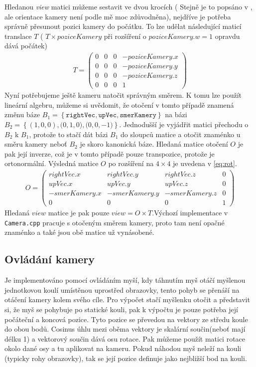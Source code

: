 Hledanou \textit{view} matici můžeme sestavit ve dvou krocích ( Stejně je to popsáno v \cite{lookAt}, ale orientace kamery není podle mě moc zdůvodněna), nejdříve je potřeba správně přesunout pozici kamery do počátku. To lze udělat následující maticí translace $ T $ ( $ T\times poziceKamery $ při rozšíření o $ poziceKamery.w=1 $ opravdu dává počátek)
\begin{align}
T=
\begin{pmatrix}
0 & 0 & 0 & -poziceKamery.x\\
0 & 0 & 0 & -poziceKamery.y\\
0 & 0 & 0 & -poziceKamery.z\\
0 & 0 & 0 & 1
\end{pmatrix}
\end{align}
Nyní potřebujeme ještě kameru natočit správným směrem. K tomu lze použít lineární algebru, můžeme si uvědomit, že otočení v tomto případě znamená změnu báze $ B_1 = \left\lbrace \texttt{rightVec},\texttt{upVec},\texttt{smerKamery}\right\rbrace $ na bázi 
$ B_2 = \left\lbrace (1,0,0),\texttt(0,1,0),\texttt(0,0,-1)\right\rbrace $.
Jednodušší je vyjádřit matici přechodu o $ B_2 $ k $ B_1 $, protože to stačí dát bázi $ B_1 $ do sloupců matice a otočit znaménko u směru kamery neboť $ B_2 $ je skoro kanonická báze. Hledaná matice otočení $ O $ je pak její inverze, což je v tomto případě pouze transpozice, protože je ortonormální. Výsledná matice $ O $ po rozšíření na $ 4\times4 $ je uvedena v \ref{eq:rot}. 
\begin{align}
\label{eq:rot}
O=
\begin{pmatrix}
rightVec.x & rightVec.y & rightVec.z & 0\\
upVec.x & upVec.y & upVec.z & 0\\
-smerKamery.x & -smerKamery.y & -smerKamery.z & 0\\
0 & 0 & 0 & 1
\end{pmatrix}
\end{align}
Hledaná $ view $ matice je pak pouze $ view=O\times T $.Výchozí implementace v \texttt{Camera.cpp} pracuje s otočeným směrem kamery, proto tam není opačné znaménko a také jsou obě matice už vynásobené.

\subsection{Ovládání kamery}

Je implementováno pomocí ovládáním myší, kdy táhnutím myš otáčí myšlenou jednotkovou koulí umístěnou uprostřed obrazovky, tento pohyb se přenáší na otáčení kamery kolem svého cíle.
Pro výpočet stačí myšlenku otočit a představit si, že myš se pohybuje po statické kouli, pak k výpočtu je pouze potřeba její počáteční a koncová pozice. Tyto pozice se převedou na vektory ze středu koule do obou bodů. Cosinus úhlu mezi oběma vektory je skalární součin(neboť mají délku 1) a vektorový součin dává osu rotace. Pak můžeme použít matici rotace okolo dané osy a tu aplikovat na kameru.
Pokud náhodou myš neleží na kouli (typicky rohy obrazovky), tak se její pozice definuje jako nejbližší bod na kouli.

